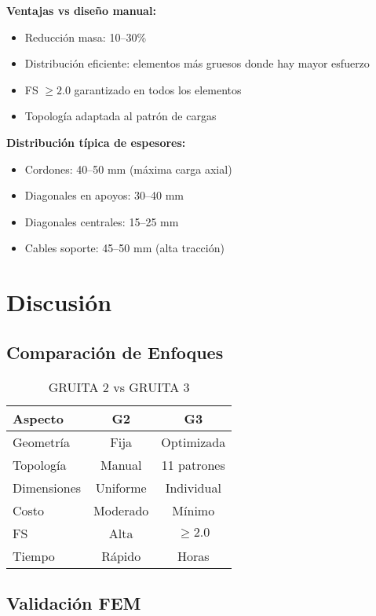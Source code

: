 \documentclass[10pt,a4paper]{article}
\begin{document}
\textbf{Ventajas vs diseño manual:}
\begin{itemize}
\item Reducción masa: 10--30\%
\item Distribución eficiente: elementos más gruesos donde hay mayor esfuerzo
\item FS $\geq 2.0$ garantizado en todos los elementos
\item Topología adaptada al patrón de cargas
\end{itemize}

\textbf{Distribución típica de espesores:}
\begin{itemize}
\item Cordones: 40--50 mm (máxima carga axial)
\item Diagonales en apoyos: 30--40 mm
\item Diagonales centrales: 15--25 mm
\item Cables soporte: 45--50 mm (alta tracción)
\end{itemize}

\section{Discusión}

\subsection{Comparación de Enfoques}

\begin{table}[H]
\small
\centering
\caption{GRUITA 2 vs GRUITA 3}
\begin{tabular}{lcc}
\toprule
\textbf{Aspecto} & \textbf{G2} & \textbf{G3} \\
\midrule
Geometría & Fija & Optimizada \\
Topología & Manual & 11 patrones \\
Dimensiones & Uniforme & Individual \\
Costo & Moderado & Mínimo \\
FS & Alta & $\geq 2.0$ \\
Tiempo & Rápido & Horas \\
\bottomrule
\end{tabular}
\end{table}

\subsection{Validación FEM}
\end{document}
